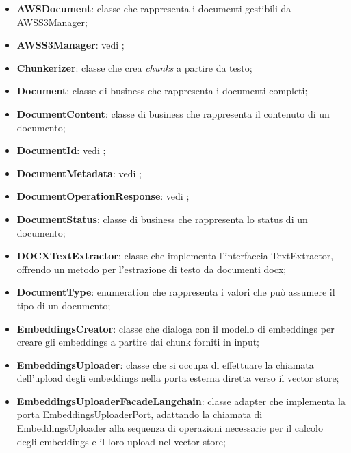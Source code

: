 \documentclass[10pt, a4paper]{article}
\begin{document}
\begin{itemize}
    \item \label{AWSDocument}\textbf{AWSDocument}: classe che rappresenta i documenti gestibili da AWSS3Manager;
    \item \textbf{AWSS3Manager}: vedi ;
    \item \label{Chunkerizer}\textbf{Chunkerizer}: classe che crea \textit{chunks\pg} a partire da testo;
    \item \label{Document}\textbf{Document}: classe di business che rappresenta i documenti completi;
    \item \label{DocumentContent}\textbf{DocumentContent}: classe di business che rappresenta il contenuto di un documento;
    \item \textbf{DocumentId}: vedi ;    
    \item \textbf{DocumentMetadata}: vedi ;
    \item \textbf{DocumentOperationResponse}: vedi ;
    \item \label{DocumentStatus} \textbf{DocumentStatus}: classe di business che rappresenta lo status di un documento;
    \item \label{DOCXTextExtractor}\textbf{DOCXTextExtractor}: classe che implementa l'interfaccia TextExtractor, offrendo un metodo per l'estrazione di testo da documenti docx;
    \item \label{DocumentType}\textbf{DocumentType}: enumeration che rappresenta i valori che può assumere il tipo di un documento;
    \item  \label{EmbeddingsCreator}\textbf{EmbeddingsCreator}: classe che dialoga con il modello di embeddings per creare gli embeddings a partire dai chunk forniti in input;
    \item \label{EmbeddingsUploader}\textbf{EmbeddingsUploader}: classe che si occupa di effettuare la chiamata dell'upload degli embeddings nella porta esterna diretta verso il vector store;
    \item \label{EmbeddingsUploaderFacadeLangchain}\textbf{EmbeddingsUploaderFacadeLangchain}: classe adapter che implementa la porta EmbeddingsUploaderPort, adattando la chiamata di EmbeddingsUploader alla sequenza di operazioni necessarie per il calcolo degli embeddings e il loro upload nel vector store;

\end{itemize}
\end{document}
